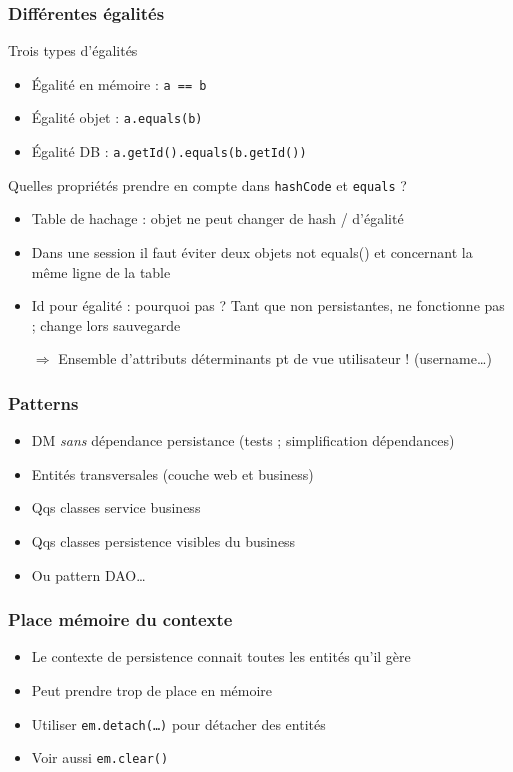 \documentclass[english, french]{beamer}
\begin{document}
\begin{frame}
	\frametitle{Différentes égalités}
	\begin{block}{Trois types d’égalités}
		\begin{itemize}
			\item Égalité en mémoire : \texttt{a == b}
			\item Égalité objet : \texttt{a.equals(b)}
			\item Égalité DB : \texttt{a.getId().equals(b.getId())}
		\end{itemize}
	\end{block}
	Quelles propriétés prendre en compte dans \texttt{hashCode} et \texttt{equals} ?
	\begin{itemize}
		\item Table de hachage : objet ne peut changer de hash / d’égalité
		\item Dans une session il faut éviter deux objets not equals() et concernant la même ligne de la table
		\item Id pour égalité : pourquoi pas ? \pause Tant que non persistantes, ne fonctionne pas ; change lors sauvegarde \pause
		\item[$⇒$] Ensemble d’attributs déterminants pt de vue utilisateur ! (username…)
	\end{itemize}
\end{frame}

\begin{frame}
	\frametitle{Patterns}
	\begin{itemize}
		\item DM \emph{sans} dépendance persistance (tests ;  simplification dépendances)
		\item Entités transversales (couche web et business)
		\item Qqs classes service business
		\item Qqs classes persistence visibles du business
		\item Ou pattern DAO…
	\end{itemize}
\end{frame}

\begin{frame}
	\frametitle{Place mémoire du contexte}
	\begin{itemize}
		\item Le contexte de persistence connait toutes les entités qu’il gère
		\item Peut prendre trop de place en mémoire
		\item Utiliser \texttt{em.detach(…)} pour détacher des entités
		\item Voir aussi \texttt{em.clear()}
	\end{itemize}
\end{frame}
\end{document}
